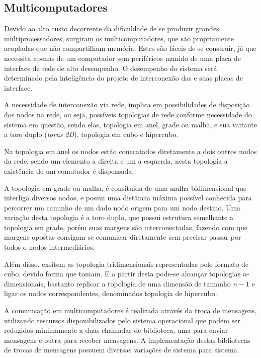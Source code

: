 \subsection{Multicomputadores}
\label{subsec:multicomputadores}

Devido ao alto custo decorrente da dificuldade de se produzir grandes multiprocessadores, surgiram os multicomputadores, que são \cpus propriamente acopladas que não compartilham memória. Estes são fáceis de se construir, já que necessita apenas de um computador sem periféricos munido de uma placa de interface de rede de alto desempenho. O desempenho do sistema será determinado pela inteligência do projeto de interconexão das \cpus e suas placas de interface.

A necessidade de interconexão via rede, implica em possibilidades de disposição dos nodos na rede, ou seja, possíveis topologias de rede conforme necessidade do sistema em questão, sendo elas, topologia em anel, grade ou malha, e sua variante a toro duplo (\textit{torus 2D}), topologia em cubo e hipercubo.

Na topologia em anel os nodos estão conecatados diretamente a dois outros nodos da rede, sendo um elemento a direita e um a esquerda, nesta topologia a existência de um comutador é dispensada.

A topologia em grade ou malha, é consituida de uma malha bidimensional que interliga diversos nodos, e possui uma distância máxima possível conhecida para percorrer um caminho de um dado nodo origem para um nodo destino. Uma variação desta topologia é a toro duplo, que possui estrutura semelhante a topologia em grade, porém suas margens são interconectadas, fazendo com que margens opostas consigam se comunicar diretamente sem precisar passar por todos o nodos intermediários.

Além disso, exsitem as topologia tridimensionais representadas pelo formato de cubo, devido forma que tomam. E a partir desta pode-se alcançar topologias $n$-dimensionais, bastanto replicar a topologia de uma dimensão de tamanho $n-1$ e ligar os nodos correspondentes, denominados topologia de hipercubo.

A comunicação em multicomputadores é realizada através da troca de mensagens, utilizando rescursos disponibilizados pelo sistema operacional que podem ser reduzidos minimamente a duas chamadas de biblioteca, uma para enviar mensagens e outra para receber mensagens. A implementação destas bibliotecas de trocas de mensagens possuem diversas variações de sistema para sistema. 

